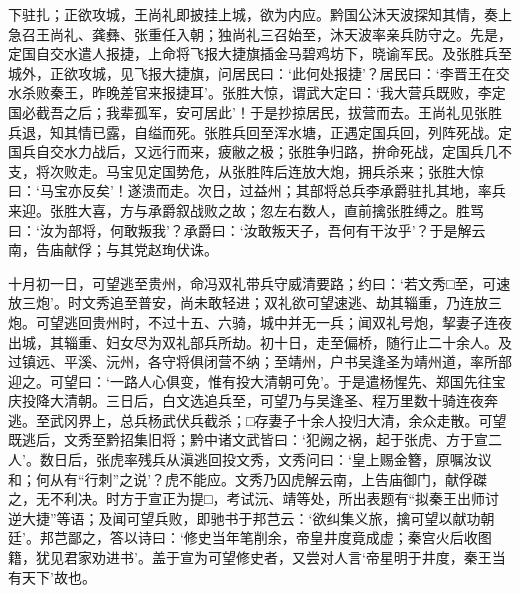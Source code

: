 \documentclass[]{article}
\begin{document}
下驻扎；正欲攻城，王尚礼即披挂上城，欲为内应。黔国公沐天波探知其情，奏上急召王尚礼、龚彝、张重任入朝；独尚礼三召始至，沐天波率亲兵防守之。先是，定国自交水遣人报捷，上命将飞报大捷旗插金马碧鸡坊下，晓谕军民。及张胜兵至城外，正欲攻城，见飞报大捷旗，问居民曰：`此何处报捷'？居民曰：`李晋王在交水杀败秦王，昨晚差官来报捷耳'。张胜大惊，谓武大定曰：`我大营兵既败，李定国必截吾之后；我辈孤军，安可居此'！于是抄掠居民，拔营而去。王尚礼见张胜兵退，知其情已露，自缢而死。张胜兵回至浑水塘，正遇定国兵回，列阵死战。定国兵自交水力战后，又远行而来，疲敝之极；张胜争归路，拚命死战，定国兵几不支，将次败走。马宝见定国势危，从张胜阵后连放大炮，拥兵杀来；张胜大惊曰：`马宝亦反矣'！遂溃而走。次日，过益州；其部将总兵李承爵驻扎其地，率兵来迎。张胜大喜，方与承爵叙战败之故；忽左右数人，直前擒张胜缚之。胜骂曰：`汝为部将，何敢叛我'？承爵曰：`汝敢叛天子，吾何有干汝乎'？于是解云南，告庙献俘；与其党赵珣伏诛。

十月初一日，可望逃至贵州，命冯双礼带兵守威清要路；约曰：`若文秀□至，可速放三炮'。时文秀追至普安，尚未敢轻进；双礼欲可望速逃、劫其辎重，乃连放三炮。可望逃回贵州时，不过十五、六骑，城中并无一兵；闻双礼号炮，挈妻子连夜出城，其辎重、妇女尽为双礼部兵所劫。初十日，走至偏桥，随行止二十余人。及过镇远、平溪、沅州，各守将俱闭营不纳；至靖州，户书吴逢圣为靖州道，率所部迎之。可望曰：`一路人心俱变，惟有投大清朝可免'。于是遣杨惺先、郑国先往宝庆投降大清朝。三日后，白文选追兵至，可望乃与吴逢圣、程万里数十骑连夜奔逃。至武冈界上，总兵杨武伏兵截杀；□存妻子十余人投归大清，余众走散。可望既逃后，文秀至黔招集旧将；黔中诸文武皆曰：`犯阙之祸，起于张虎、方于宣二人'。数日后，张虎率残兵从滇逃回投文秀，文秀问曰：`皇上赐金簪，原嘱汝议和；何从有``行刺''之说'？虎不能应。文秀乃囚虎解云南，上告庙御门，献俘磔之，无不利决。时方于宣正为提□，考试沅、靖等处，所出表题有``拟秦王出师讨逆大捷''等语；及闻可望兵败，即驰书于邦芑云：`欲纠集义旅，擒可望以献功朝廷'。邦芑鄙之，答以诗曰：`修史当年笔削余，帝皇井度竟成虚；秦宫火后收图籍，犹见君家劝进书'。盖于宣为可望修史者，又尝对人言`帝星明于井度，秦王当有天下'故也。
\end{document}
